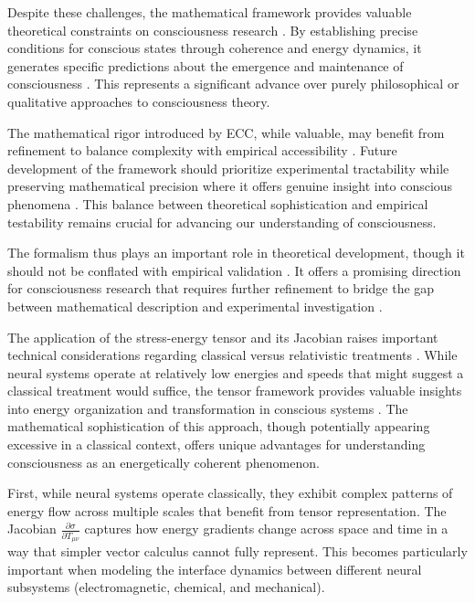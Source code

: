 \begin{refsection}
Despite these challenges, the mathematical framework provides valuable theoretical constraints on consciousness research \cite{koch2019feeling, thompson2014waking}. By establishing precise conditions for conscious states through coherence and energy dynamics, it generates specific predictions about the emergence and maintenance of consciousness \cite{varela2016embodied}. This represents a significant advance over purely philosophical or qualitative approaches to consciousness theory.

The mathematical rigor introduced by ECC, while valuable, may benefit from refinement to balance complexity with empirical accessibility \cite{chalmers2010character}. Future development of the framework should prioritize experimental tractability while preserving mathematical precision where it offers genuine insight into conscious phenomena \cite{seth2021being}. This balance between theoretical sophistication and empirical testability remains crucial for advancing our understanding of consciousness.

The formalism thus plays an important role in theoretical development, though it should not be conflated with empirical validation \cite{goff2019galileo}. It offers a promising direction for consciousness research that requires further refinement to bridge the gap between mathematical description and experimental investigation \cite{feinberg2016ancient}.

The application of the stress-energy tensor and its Jacobian raises important technical considerations regarding classical versus relativistic treatments \cite{rosen2012anticipatory}. While neural systems operate at relatively low energies and speeds that might suggest a classical treatment would suffice, the tensor framework provides valuable insights into energy organization and transformation in conscious systems \cite{rovelli2018order}. The mathematical sophistication of this approach, though potentially appearing excessive in a classical context, offers unique advantages for understanding consciousness as an energetically coherent phenomenon.

First, while neural systems operate classically, they exhibit complex patterns of energy flow across multiple scales that benefit from tensor representation. The Jacobian $\frac{\partial \sigma}{\partial T_{\mu\nu}}$ captures how energy gradients change across space and time in a way that simpler vector calculus cannot fully represent. This becomes particularly important when modeling the interface dynamics between different neural subsystems (electromagnetic, chemical, and mechanical).


\end{refsection}
